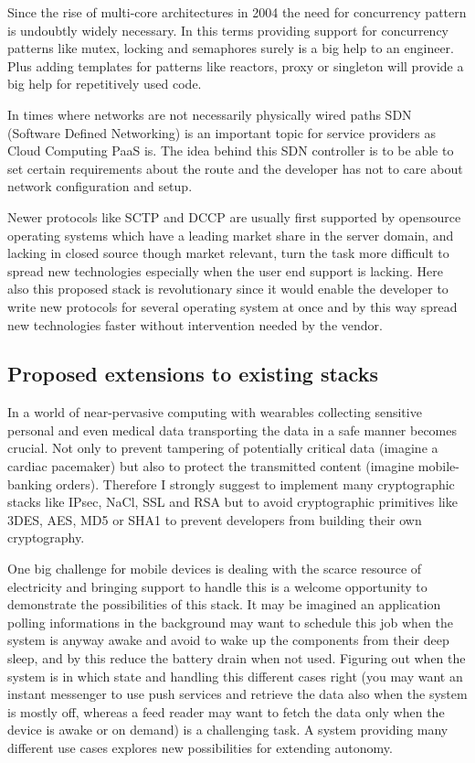 \documentclass[twocolumn,english]{IEEEtran}
\theoremstyle{plain}
\theoremstyle{plain}
\begin{document}
Since the rise of multi-core architectures in
2004\cite{amd:first-multicore-x86} the need for concurrency pattern is
undoubtly widely necessary. In this terms providing support for concurrency
patterns like mutex, locking and semaphores surely is a big help to an
engineer. Plus adding templates for patterns like reactors, proxy or singleton
will provide a big help for repetitively used code.

In times where networks are not necessarily physically wired paths SDN
(Software Defined Networking) is an important topic for service providers as
Cloud Computing PaaS is. The idea behind this SDN controller is to be able to
set certain requirements about the route and the developer has not to care
about network configuration and setup.

Newer protocols like SCTP and DCCP are usually first supported by opensource
operating systems which have a leading market share in the server
domain\cite{w3techs:os-web}, and lacking in closed source though market
relevant, turn the task more difficult to spread new technologies especially
when the user end support is lacking\cite{netmarketshare:desktop-os}. Here
also this proposed stack is revolutionary since it would enable the developer
to write new protocols for several operating system at once and by this way
spread new technologies faster without intervention needed by the vendor.

\subsection{Proposed extensions to existing stacks}

In a world of near-pervasive computing with wearables collecting sensitive
personal and even medical data transporting the data in a safe manner becomes
crucial. Not only to prevent tampering of potentially critical data (imagine a
cardiac pacemaker) but also to protect the transmitted content (imagine
mobile-banking orders). Therefore I strongly suggest to implement many
cryptographic stacks like IPsec, NaCl, SSL and RSA but to avoid cryptographic
primitives like 3DES, AES, MD5 or SHA1 to prevent developers from building
their own cryptography.

One big challenge for mobile devices is dealing with the scarce resource of
electricity and bringing support to handle this is a welcome opportunity to
demonstrate the possibilities of this stack. It may be imagined an application
polling informations in the background may want to schedule this job when the
system is anyway awake and avoid to wake up the components from their deep
sleep, and by this reduce the battery drain when not used. Figuring out when
the system is in which state and handling this different cases right (you may
want an instant messenger to use push services and retrieve the data also when
the system is mostly off, whereas a feed reader may want to fetch the data
only when the device is awake or on demand) is a challenging task. A system
providing many different use cases explores new possibilities for extending
autonomy.
\end{document}
